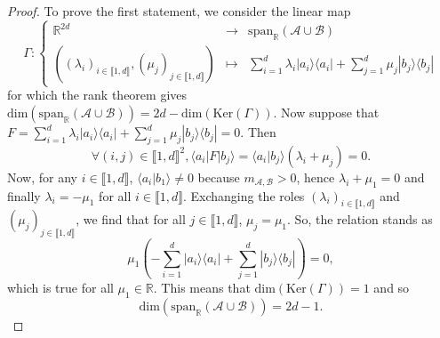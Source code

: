 \documentclass[a4paper, notitlepage, 11pt]{article}
\numberwithin{equation}{section}
\newcommand{\bra}[1]{\langle #1|}
\newcommand{\cket}[1]{|#1\rangle}
\newcommand{\bracket}[2]{\langle #1|#2\rangle}
\newcommand{\Acal}{{\mathcal A}}
\newcommand{\Bcal}{{\mathcal B}}
\newcommand{\spanRAB}{{\mathrm{span}_{\R}(\Acal\cup\Bcal)}}
\newcommand{\Ker}{{\mathrm{Ker}}}
\newcommand{\R}{\mathbb{R}}
\newcommand{\mab}{m_{\Acal,\Bcal}}
\newcommand{\IntEnt}[2]{\llbracket #1 , #2 \rrbracket}
\begin{document}
\begin{proof} To prove the first statement, we consider the linear map 
\[
\Gamma : \left\{\begin{array}{rcl}
 \R^{2d}  & \rightarrow & \spanRAB \\
 ((\lambda_{i})_{i\in\IntEnt{1}{d}},(\mu_{j})_{j\in\IntEnt{1}{d}})& \mapsto & \sum_{i=1}^{d} \lambda_{i}\cket{a_i}\bra{a_i} + \sum_{j=1}^{d} \mu_{j}\cket{b_j}\bra{b_j}
\end{array}\right.
\]
for which the rank theorem gives $\text{dim}\left(\spanRAB\right) = 2d- \text{dim}\left(\Ker(\Gamma)\right)$.
Now suppose that $F = \sum_{i=1}^{d} \lambda_{i}\cket{a_i}\bra{a_i} + \sum_{j=1}^{d} \mu_{j}\cket{b_j}\bra{b_j} =0$. Then
\[
\forall (i,j)\in\IntEnt{1}{d}^2, \bra{a_i}F\cket{b_j} = \bracket{a_i}{b_j}\left(\lambda_{i}+\mu_{j}\right)=0.
\]
Now, for any  $i\in\IntEnt{1}{d}$,  $\bracket{a_i}{b_1}\neq 0$ because $\mab > 0$, hence $\lambda_{i}+\mu_{1} = 0$ and finally $\lambda_{i} = -\mu_{1}$ for all $i\in\IntEnt{1}{d}$. 
Exchanging the roles $(\lambda_{i})_{i\in\IntEnt{1}{d}}$ and $(\mu_{j})_{j\in\IntEnt{1}{d}}$, we find that for all $j\in\IntEnt{1}{d}$,  $\mu_{j}=\mu_{1}$. So, the relation stands as
\[
\mu_{1}\left(-\sum_{i=1}^{d} \cket{a_i}\bra{a_i} + \sum_{j=1}^{d}\cket{b_j}\bra{b_j}\right) =0,
\]
which is true for all $\mu_{1}\in\R$. This means that $\text{dim}\left(\Ker(\Gamma)\right) =1$ and so 
\[
\text{dim}\left(\spanRAB\right) = 2d- 1.
\]


\end{proof}
\end{document}
